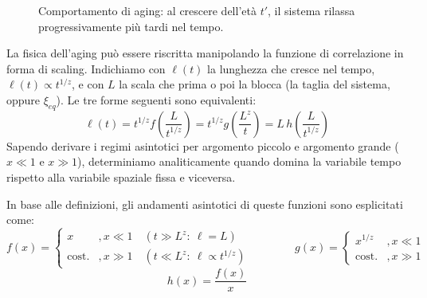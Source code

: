 \begin{figure}[H]
    \centering
    \caption{Comportamento di aging: al crescere dell'età $t'$, il sistema rilassa progressivamente più tardi nel tempo.}
\end{figure}



\begin{tcolorbox}[colback=colorC!10, colframe=colorC!80!black, title=\textbf{Richiami di Teoria dello Scaling}]
La fisica dell'aging può essere riscritta manipolando la funzione di correlazione in forma di scaling. Indichiamo con $\ell(t)$ la lunghezza che cresce nel tempo, $\ell(t) \propto t^{1/z}$, e con $L$ la scala che prima o poi la blocca (la taglia del sistema, oppure $\xi_{eq}$). Le tre forme seguenti sono equivalenti:
\begin{equation}
    \ell(t) = t^{1/z} f\left(\frac{L}{t^{1/z}}\right) = t^{1/z} g\left(\frac{L^z}{t}\right) = L\, h\left(\frac{L}{t^{1/z}}\right)
\end{equation}
Sapendo derivare i regimi asintotici per argomento piccolo e argomento grande ($x \ll 1$ e $x \gg 1$), determiniamo analiticamente quando domina la variabile tempo rispetto alla variabile spaziale fissa e viceversa.
\end{tcolorbox}
In base alle definizioni, gli andamenti asintotici di queste funzioni sono esplicitati come:
\begin{equation}
    f(x) = \begin{cases} 
    x & , x \ll 1 \quad (t \gg L^z:\ \ell = L) \\ 
    \text{cost.} & , x \gg 1 \quad (t \ll L^z:\ \ell \propto t^{1/z})
    \end{cases} 
    \qquad \qquad
    g(x) = \begin{cases} 
    x^{1/z} & , x \ll 1 \\ 
    \text{cost.} & , x \gg 1 
    \end{cases}
\end{equation}
\begin{equation}
    h(x) = \frac{f(x)}{x}
\end{equation}


